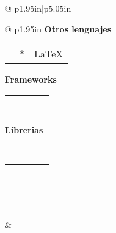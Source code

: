\documentclass{article}
\newcommand{\bt}[1]{\textbf{#1}}
\begin{document}
\begin{tabular}{@{} p{1.95in}|p{5.05in}}
\begin{tabular}{@{} p{1.95in}}
            \vspace{0.1in}
            \bt{Otros lenguajes} \\
            \def\arraystretch{3.5}
            \hspace*{0.2in}
            \begin{tabular}{ c c c} 
                 \Huge{\faHtml5} & \Huge{\faCss3*} & \LARGE{\LaTeX}
            \end{tabular}

            \vspace{0.1in}
            \bt{Frameworks} \\
            \def\arraystretch{3.5}
            \hspace*{0.35in}
            \begin{tabular}{ c c} 
                 \Huge{\faVuejs} & ~~~~~\Huge{\faLaravel} 
            \end{tabular}

            \vspace{0.1in}
            \bt{Librerias} \\
            \def\arraystretch{3.5}
            \hspace*{0.35in}
            \begin{tabular}{ c c} 
                 \Huge{\faReact} & ~~~~~\Huge{\faBootstrap} 
            \end{tabular} \\
            ~ \\ ~

        \end{tabular}

        &

        \begin{tabular}{@{} p{3in}}


\end{tabular}
\end{tabular}
\end{document}
